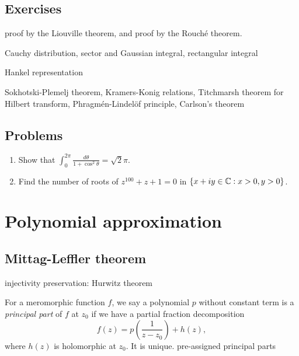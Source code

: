 \documentclass{../../large}
\begin{document}
\section*{Exercises}
\begin{prb}
proof by the Liouville theorem, and proof by the Rouch\'e theorem.
\end{prb}
\begin{prb}
Cauchy distribution,
sector and Gaussian integral,
rectangular integral
\end{prb}
\begin{prb}
\end{prb}
\begin{prb}
Hankel representation
\end{prb}
\begin{prb}
\end{prb}

Sokhotski-Plemelj theorem,
Kramers-Konig relations,
Titchmarsh theorem for Hilbert transform,
Phragm\'en-Lindel\"of principle,
Carlson's theorem

\section*{Problems}
\begin{enumerate}
\item Show that $\int_0^{2\pi}\frac{d\theta}{1+\cos^2\theta}=\sqrt2\pi$.
\item Find the number of roots of $z^{100}+z+1=0$ in $\{x+iy\in\mathbb{C}:x>0,y>0\}$.
\end{enumerate}




\chapter{Polynomial approximation}
\section{Mittag-Leffler theorem}
\begin{prb}
\begin{parts}
\item injectivity preservation: Hurwitz theorem
\end{parts}
\end{prb}

\begin{prb}
For a meromorphic function $f$, we say a polynomial $p$ without constant term is a \emph{principal part} of $f$ at $z_0$ if we have a partial fraction decomposition
\[f(z)=p\left(\frac1{z-z_0}\right)+h(z),\]
where $h(z)$ is holomorphic at $z_0$.
It is unique.
pre-assigned principal parts
\end{prb}
\end{document}
